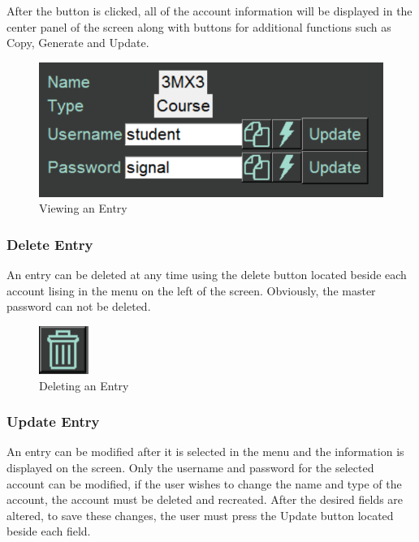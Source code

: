 \documentclass[12pt, titlepage]{article}
\begin{document}
\newpage
After the button is clicked, all of the account information will be displayed in the center panel of the screen along with buttons for additional functions such as Copy, Generate and Update. 

\begin{figure}[h]
	\centering
	\includegraphics[scale=1.0]{images/UpdateEntry.PNG}
	\caption{Viewing an Entry}
	\label{fig:VieEnt2}
\end{figure}


\subsubsection{Delete Entry} \label{DelEnt}

An entry can be deleted at any time using the delete button located beside each account lising in the menu on the left of the screen. Obviously, the master password can not be deleted.

\begin{figure}[h]
	\centering
	\includegraphics[scale=1.0]{images/DeleteEntry.PNG}
	\caption{Deleting an Entry}
	\label{fig:DeEnt}
\end{figure}

\subsubsection{Update Entry} \label{UpdateEnt}

An entry can be modified after it is selected in the menu and the information is displayed on the screen. Only the username and password for the selected account can be modified, if the user wishes to change the name and type of the account, the account must be deleted and recreated. After the desired fields are altered, to save these changes, the user must press the Update button located beside each field.
\end{document}

